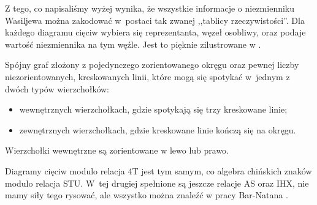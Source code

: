 Z tego, co napisaliśmy wyżej wynika, że wszystkie informacje o niezmienniku Wasiljewa można zakodować w~postaci tak zwanej ,,tablicy rzeczywistości''.
Dla każdego diagramu cięciw wybiera się reprezentanta, węzeł osobliwy, oraz podaje wartość niezmiennika na tym węźle.
Jest to pięknie zilustrowane w \cite[sekcja 3.7]{duzhin2012}.

\begin{definition}
    Spójny graf złożony z pojedynczego zorientowanego okręgu oraz pewnej liczby niezorientowanych, kreskowanych linii, które mogą się spotykać w~jednym z dwóch typów wierzchołków:
    \begin{itemize}
        \item wewnętrznych wierzchołkach, gdzie spotykają się trzy kreskowane linie;
        \item zewnętrznych wierzchołkach, gdzie kreskowane linie kończą się na okręgu.
    \end{itemize}
    Wierzchołki wewnętrzne są zorientowane w lewo lub prawo.
\end{definition}

Diagramy cięciw modulo relacja 4T jest tym samym, co algebra chińskich znaków modulo relacja STU.
%
%
W~tej drugiej spełnione są jeszcze relacje AS oraz IHX, nie mamy siły tego rysować, ale wszystko można znaleźć w pracy Bar-Natana \cite{barnatand1995}.
%

